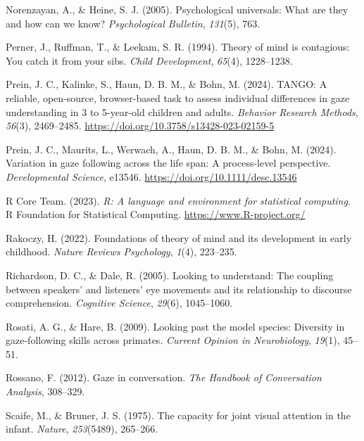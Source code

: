 \documentclass[
  man,floatsintext]{apa7}
\newlength{\cslhangindent}
\newenvironment{CSLReferences}[2] %
 {\begin{list}{}{%
  \setlength{\itemindent}{0pt}
  \setlength{\leftmargin}{0pt}
  \setlength{\parsep}{0pt}
  \ifodd #1
   \setlength{\leftmargin}{\cslhangindent}
   \setlength{\itemindent}{-1\cslhangindent}
  \fi
  \setlength{\itemsep}{#2\baselineskip}}}
 {\end{list}}
\begin{document}
\begin{CSLReferences}{1}{0}
Norenzayan, A., \& Heine, S. J. (2005). Psychological universals: What are they and how can we know? \emph{Psychological Bulletin}, \emph{131}(5), 763.

Perner, J., Ruffman, T., \& Leekam, S. R. (1994). Theory of mind is contagious: You catch it from your sibs. \emph{Child Development}, \emph{65}(4), 1228--1238.

Prein, J. C., Kalinke, S., Haun, D. B. M., \& Bohn, M. (2024). {TANGO}: {A} reliable, open-source, browser-based task to assess individual differences in gaze understanding in 3 to 5-year-old children and adults. \emph{Behavior Research Methods}, \emph{56}(3), 2469--2485. \url{https://doi.org/10.3758/s13428-023-02159-5}

Prein, J. C., Maurits, L., Werwach, A., Haun, D. B. M., \& Bohn, M. (2024). Variation in gaze following across the life span: {A} process-level perspective. \emph{Developmental Science}, e13546. \url{https://doi.org/10.1111/desc.13546}

R Core Team. (2023). \emph{R: A language and environment for statistical computing}. R Foundation for Statistical Computing. \url{https://www.R-project.org/}

Rakoczy, H. (2022). Foundations of theory of mind and its development in early childhood. \emph{Nature Reviews Psychology}, \emph{1}(4), 223--235.

Richardson, D. C., \& Dale, R. (2005). Looking to understand: The coupling between speakers' and listeners' eye movements and its relationship to discourse comprehension. \emph{Cognitive Science}, \emph{29}(6), 1045--1060.

Rosati, A. G., \& Hare, B. (2009). Looking past the model species: Diversity in gaze-following skills across primates. \emph{Current Opinion in Neurobiology}, \emph{19}(1), 45--51.

Rossano, F. (2012). Gaze in conversation. \emph{The Handbook of Conversation Analysis}, 308--329.

Scaife, M., \& Bruner, J. S. (1975). The capacity for joint visual attention in the infant. \emph{Nature}, \emph{253}(5489), 265--266.


\end{CSLReferences}
\end{document}
